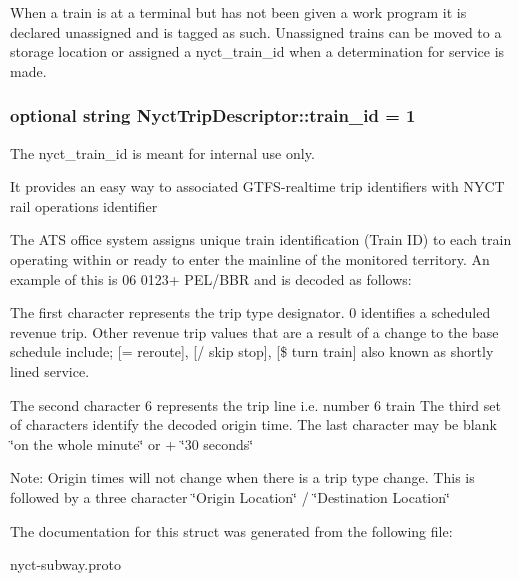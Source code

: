 When a train is at a terminal but has not been given a work program it is declared unassigned and is tagged as such. Unassigned trains can be moved to a storage location or assigned a nyct\+\_\+train\+\_\+id when a determination for service is made. 
\subsubsection[{\texorpdfstring{train\+\_\+id}{train_id}}]{\setlength{\rightskip}{0pt plus 5cm}optional string Nyct\+Trip\+Descriptor\+::train\+\_\+id = 1}\hypertarget{structNyctTripDescriptor_a03a9908ba609b45afe28699e06dc01fb}{}\label{structNyctTripDescriptor_a03a9908ba609b45afe28699e06dc01fb}


The nyct\+\_\+train\+\_\+id is meant for internal use only. 

It provides an easy way to associated G\+T\+F\+S-\/realtime trip identifiers with N\+Y\+CT rail operations identifier

The A\+TS office system assigns unique train identification (Train ID) to each train operating within or ready to enter the mainline of the monitored territory. An example of this is 06 0123+ P\+E\+L/\+B\+BR and is decoded as follows\+:

The first character represents the trip type designator. 0 identifies a scheduled revenue trip. Other revenue trip values that are a result of a change to the base schedule include; \mbox{[}= reroute\mbox{]}, \mbox{[}/ skip stop\mbox{]}, \mbox{[}\$ turn train\mbox{]} also known as shortly lined service.

The second character 6 represents the trip line i.\+e. number 6 train The third set of characters identify the decoded origin time. The last character may be blank \char`\"{}on the whole minute\char`\"{} or + \char`\"{}30 seconds\char`\"{}

Note\+: Origin times will not change when there is a trip type change. This is followed by a three character \char`\"{}\+Origin Location\char`\"{} / \char`\"{}\+Destination
\+Location\char`\"{} 

The documentation for this struct was generated from the following file\+:\begin{DoxyCompactItemize}
\item 
nyct-\/subway.\+proto\end{DoxyCompactItemize}
